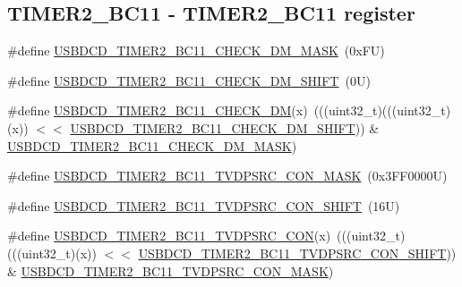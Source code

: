 \subsection*{T\+I\+M\+E\+R2\+\_\+\+B\+C11 -\/ T\+I\+M\+E\+R2\+\_\+\+B\+C11 register}
\begin{DoxyCompactItemize}
\item 
\#define \mbox{\hyperlink{group___u_s_b_d_c_d___register___masks_ga0b011ea67418c2cb8e3a45f396fd8819}{U\+S\+B\+D\+C\+D\+\_\+\+T\+I\+M\+E\+R2\+\_\+\+B\+C11\+\_\+\+C\+H\+E\+C\+K\+\_\+\+D\+M\+\_\+\+M\+A\+SK}}~(0x\+F\+U)
\item 
\#define \mbox{\hyperlink{group___u_s_b_d_c_d___register___masks_gaa0b16aa7f0c9f3713c738c0d63b3d647}{U\+S\+B\+D\+C\+D\+\_\+\+T\+I\+M\+E\+R2\+\_\+\+B\+C11\+\_\+\+C\+H\+E\+C\+K\+\_\+\+D\+M\+\_\+\+S\+H\+I\+FT}}~(0\+U)
\item 
\#define \mbox{\hyperlink{group___u_s_b_d_c_d___register___masks_ga934bb0d81810c5aa1deebbe47fe86d4d}{U\+S\+B\+D\+C\+D\+\_\+\+T\+I\+M\+E\+R2\+\_\+\+B\+C11\+\_\+\+C\+H\+E\+C\+K\+\_\+\+DM}}(x)~(((uint32\+\_\+t)(((uint32\+\_\+t)(x)) $<$$<$ \mbox{\hyperlink{group___u_s_b_d_c_d___register___masks_gaa0b16aa7f0c9f3713c738c0d63b3d647}{U\+S\+B\+D\+C\+D\+\_\+\+T\+I\+M\+E\+R2\+\_\+\+B\+C11\+\_\+\+C\+H\+E\+C\+K\+\_\+\+D\+M\+\_\+\+S\+H\+I\+FT}})) \& \mbox{\hyperlink{group___u_s_b_d_c_d___register___masks_ga0b011ea67418c2cb8e3a45f396fd8819}{U\+S\+B\+D\+C\+D\+\_\+\+T\+I\+M\+E\+R2\+\_\+\+B\+C11\+\_\+\+C\+H\+E\+C\+K\+\_\+\+D\+M\+\_\+\+M\+A\+SK}})
\item 
\#define \mbox{\hyperlink{group___u_s_b_d_c_d___register___masks_gad0058047f4d8025f1ea9139d1b505b51}{U\+S\+B\+D\+C\+D\+\_\+\+T\+I\+M\+E\+R2\+\_\+\+B\+C11\+\_\+\+T\+V\+D\+P\+S\+R\+C\+\_\+\+C\+O\+N\+\_\+\+M\+A\+SK}}~(0x3\+F\+F0000\+U)
\item 
\#define \mbox{\hyperlink{group___u_s_b_d_c_d___register___masks_ga11ac4ed3e448170b1b94578b8398e2dd}{U\+S\+B\+D\+C\+D\+\_\+\+T\+I\+M\+E\+R2\+\_\+\+B\+C11\+\_\+\+T\+V\+D\+P\+S\+R\+C\+\_\+\+C\+O\+N\+\_\+\+S\+H\+I\+FT}}~(16\+U)
\item 
\#define \mbox{\hyperlink{group___u_s_b_d_c_d___register___masks_gafe8c25b0327bf55ecb4069581007a9f7}{U\+S\+B\+D\+C\+D\+\_\+\+T\+I\+M\+E\+R2\+\_\+\+B\+C11\+\_\+\+T\+V\+D\+P\+S\+R\+C\+\_\+\+C\+ON}}(x)~(((uint32\+\_\+t)(((uint32\+\_\+t)(x)) $<$$<$ \mbox{\hyperlink{group___u_s_b_d_c_d___register___masks_ga11ac4ed3e448170b1b94578b8398e2dd}{U\+S\+B\+D\+C\+D\+\_\+\+T\+I\+M\+E\+R2\+\_\+\+B\+C11\+\_\+\+T\+V\+D\+P\+S\+R\+C\+\_\+\+C\+O\+N\+\_\+\+S\+H\+I\+FT}})) \& \mbox{\hyperlink{group___u_s_b_d_c_d___register___masks_gad0058047f4d8025f1ea9139d1b505b51}{U\+S\+B\+D\+C\+D\+\_\+\+T\+I\+M\+E\+R2\+\_\+\+B\+C11\+\_\+\+T\+V\+D\+P\+S\+R\+C\+\_\+\+C\+O\+N\+\_\+\+M\+A\+SK}})
\end{DoxyCompactItemize}
